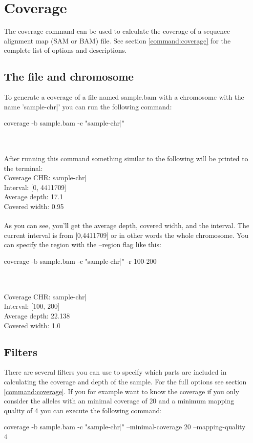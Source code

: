 \section{Coverage}
The coverage command can be used to calculate the coverage of a sequence alignment map (SAM or BAM) file. See section \ref{command:coverage} for the complete list of options and descriptions.\\

\subsection{The file and chromosome}
To generate a coverage of a file named sample.bam with a chromosome with the name 'sample-chr|' you can run the following command:
\\
\begin{markdown}
coverage -b sample.bam -c "sample-chr|"
\end{markdown}
\\
\\
After running this command something similar to the following will be printed to the terminal:\\
Coverage CHR: sample-chr|\\
Interval: [0, 4411709]\\
Average depth: 17.1\\
Covered width: 0.95\\
\\
As you can see, you'll get the average depth, covered width, and the interval. The current interval is from [0,4411709] or in other words the whole chromosome. You can specify the region with the --region flag like this:
\\
\begin{markdown}
coverage -b sample.bam -c "sample-chr|" -r 100-200
\end{markdown}
\\
\\
Coverage CHR: sample-chr|\\
Interval: [100, 200]\\
Average depth: 22.138\\
Covered width: 1.0\\

\subsection{Filters}
There are several filters you can use to specify which parts are included in calculating the coverage and depth of the sample. For the full options see section \ref{command:coverage}. If you for example want to know the coverage if you only consider the alleles with an minimal coverage of 20 and a minimum mapping quality of 4 you can execute the following command:
\\
\begin{markdown}
coverage -b sample.bam -c "sample-chr|"  --minimal-coverage 20 --mapping-quality 4
\end{markdown}

